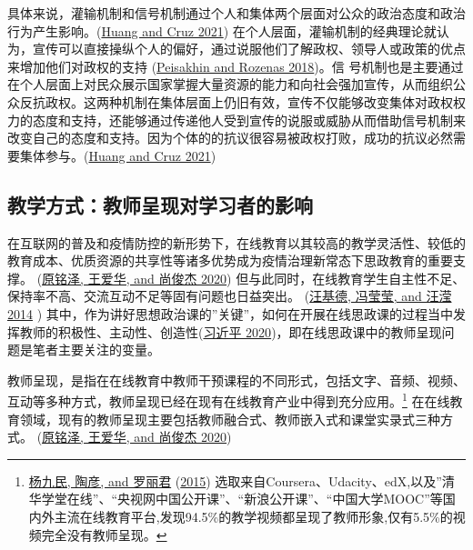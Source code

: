 \documentclass[
  12pt,
]{ctexart}
\begin{document}
具体来说，灌输机制和信号机制通过个人和集体两个层面对公众的政治态度和政治行为产生影响。(\protect\hyperlink{ref-HuangCruz2021}{Huang and Cruz 2021}) 在个人层面，灌输机制的经典理论就认为，宣传可以直接操纵个人的偏好，通过说服他们了解政权、领导人或政策的优点来增加他们对政权的支持 (\protect\hyperlink{ref-PeisakhinRozenas2018}{Peisakhin and Rozenas 2018})。信 号机制也是主要通过在个人层面上对民众展示国家掌握大量资源的能力和向社会强加宣传，从而组织公众反抗政权。这两种机制在集体层面上仍旧有效，宣传不仅能够改变集体对政权权力的态度和支持，还能够通过传递他人受到宣传的说服或威胁从而借助信号机制来改变自己的态度和支持。因为个体的的抗议很容易被政权打败，成功的抗议必然需要集体参与。(\protect\hyperlink{ref-HuangCruz2021}{Huang and Cruz 2021})

\hypertarget{ux6559ux5b66ux65b9ux5f0fux6559ux5e08ux5448ux73b0ux5bf9ux5b66ux4e60ux8005ux7684ux5f71ux54cd}{%
\subsection{教学方式：教师呈现对学习者的影响}\label{ux6559ux5b66ux65b9ux5f0fux6559ux5e08ux5448ux73b0ux5bf9ux5b66ux4e60ux8005ux7684ux5f71ux54cd}}

在互联网的普及和疫情防控的新形势下，在线教育以其较高的教学灵活性、较低的教育成本、优质资源的共享性等诸多优势成为疫情治理新常态下思政教育的重要支撑。 (\protect\hyperlink{ref-YuanMingZeEtAl2020a}{原铭泽, 王爱华, and 尚俊杰 2020}) 但与此同时，在线教育学生自主性不足、保持率不高、交流互动不足等固有问题也日益突出。 (\protect\hyperlink{ref-WangJiDeEtAl2014}{汪基德, 冯莹莹, and 汪滢 2014} ) 其中，作为讲好思想政治课的''关键''，如何在开展在线思政课的过程当中发挥教师的积极性、主动性、创造性(\protect\hyperlink{ref-XiJinPing2020}{习近平 2020})，即在线思政课中的教师呈现问题是笔者主要关注的变量。

教师呈现，是指在在线教育中教师干预课程的不同形式，包括文字、音频、视频、互动等多种方式，教师呈现已经在现有在线教育产业中得到充分应用。\footnote{\protect\hyperlink{ref-YangJiuMinEtAl2015}{杨九民, 陶彦, and 罗丽君} (\protect\hyperlink{ref-YangJiuMinEtAl2015}{2015}) 选取来自Coursera、Udacity、edX,以及''清华学堂在线''、``央视网中国公开课''、``新浪公开课''、``中国大学MOOC''等国内外主流在线教育平台,发现94.5\%的教学视频都呈现了教师形象,仅有5.5\%的视频完全没有教师呈现。}
在在线教育领域，现有的教师呈现主要包括教师融合式、教师嵌入式和课堂实录式三种方式。
(\protect\hyperlink{ref-YuanMingZeEtAl2020a}{原铭泽, 王爱华, and 尚俊杰 2020})
\end{document}
